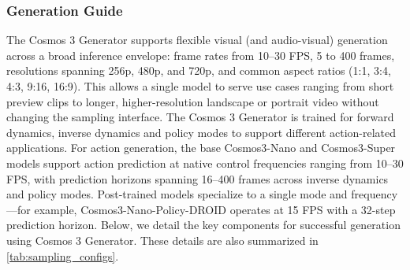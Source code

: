 \documentclass{llmxive}
\begin{document}
\subsubsection{Generation Guide}
\label{sec::gen_guide}

The Cosmos 3 Generator supports flexible visual (and audio-visual) generation across a broad inference envelope: frame rates from 10–30 FPS, 5 to 400 frames, resolutions spanning 256p, 480p, and 720p, and common aspect ratios (1:1, 3:4, 4:3, 9:16, 16:9). This allows a single model to serve use cases ranging from short preview clips to longer, higher-resolution landscape or portrait video without changing the sampling interface. The Cosmos 3 Generator is trained for forward dynamics, inverse dynamics and policy modes to support different action-related applications. For action generation, the base Cosmos3-Nano and Cosmos3-Super models support action prediction at native control frequencies ranging from 10–30 FPS, with prediction horizons spanning 16–400 frames across inverse dynamics and policy modes. Post-trained models specialize to a single mode and frequency---for example, Cosmos3-Nano-Policy-DROID operates at 15 FPS with a 32-step prediction horizon. Below, we detail the key components for successful generation using Cosmos 3 Generator. These details are also summarized in \cref{tab:sampling_configs}.
\end{document}
